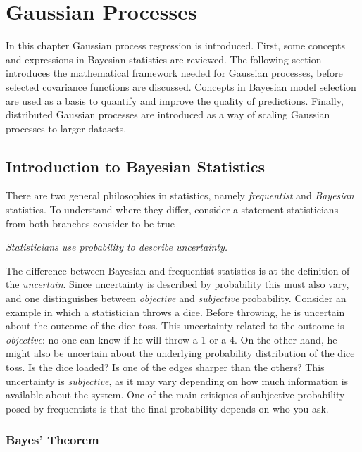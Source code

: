 \documentclass[twoside,english]{uiofysmaster}
\begin{document}
\chapter{Gaussian Processes}

In this chapter Gaussian process regression is introduced. First, some concepts and expressions in Bayesian statistics are reviewed. The following section introduces the mathematical framework needed for Gaussian processes, before selected covariance functions are discussed. Concepts in Bayesian model selection are used as a basis to quantify and improve the quality of predictions. Finally, distributed Gaussian processes are introduced as a way of scaling Gaussian processes to larger datasets.

\section{Introduction to Bayesian Statistics}

There are two general philosophies in statistics, namely \textit{frequentist} and \textit{Bayesian} statistics. To understand where they differ, consider a statement statisticians from both branches consider to be true

\begin{center}
\textit{Statisticians use probability to describe uncertainty.}
\end{center}

The difference between Bayesian and frequentist statistics is at the definition of the \textit{uncertain}. Since uncertainty is described by probability this must also vary, and one distinguishes between \textit{objective} and \textit{subjective} probability. Consider an example in which a statistician throws a dice. Before throwing, he is uncertain about the outcome of the dice toss. This uncertainty related to the outcome is \textit{objective}: no one can know if he will throw a 1 or a 4. On the other hand, he might also be uncertain about the underlying probability distribution of the dice toss. Is the dice loaded? Is one of the edges sharper than the others? This uncertainty is \textit{subjective}, as it may vary depending on how much information is available about the system. One of the main critiques of subjective probability posed by frequentists is that the final probability depends on who you ask.

\subsection{Bayes' Theorem}
\end{document}
